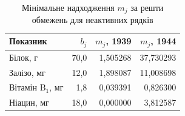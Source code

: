 \begin{table}[htbp]
\centering\small
\caption{Мінімальне надходження $m_j$ за решти обмежень для неактивних рядків}
\label{tab:glpk-redundancy}
\begin{tabular}{lrrr}
\toprule
Показник & $b_j$ & $m_j$, 1939 & $m_j$, 1944 \\
\midrule
Білок, г & 70{,}0 & 1{,}505268 & 37{,}730293 \\
Залізо, мг & 12{,}0 & 1{,}898087 & 11{,}008698 \\
Вітамін B$_1$, мг & 1{,}8 & 0{,}039391 & 0{,}826300 \\
Ніацин, мг & 18{,}0 & 0{,}000000 & 3{,}812587 \\
\bottomrule
\end{tabular}
\end{table}
